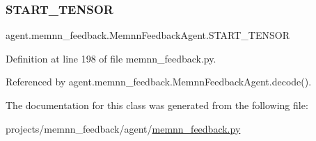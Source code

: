 \subsubsection{\texorpdfstring{S\+T\+A\+R\+T\+\_\+\+T\+E\+N\+S\+OR}{START\_TENSOR}}
{\footnotesize\ttfamily agent.\+memnn\+\_\+feedback.\+Memnn\+Feedback\+Agent.\+S\+T\+A\+R\+T\+\_\+\+T\+E\+N\+S\+OR}



Definition at line 198 of file memnn\+\_\+feedback.\+py.



Referenced by agent.\+memnn\+\_\+feedback.\+Memnn\+Feedback\+Agent.\+decode().



The documentation for this class was generated from the following file\+:\begin{DoxyCompactItemize}
\item 
projects/memnn\+\_\+feedback/agent/\hyperlink{memnn__feedback_8py}{memnn\+\_\+feedback.\+py}\end{DoxyCompactItemize}
